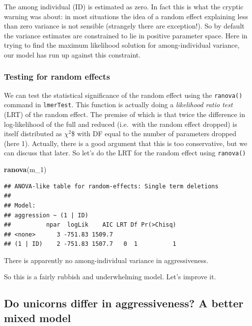 \documentclass[
  12pt,
]{book}
\newenvironment{Shaded}{\begin{snugshade}}{\end{snugshade}}
\newcommand{\DecValTok}[1]{\textcolor[rgb]{0.00,0.00,0.81}{#1}}
\newcommand{\KeywordTok}[1]{\textcolor[rgb]{0.13,0.29,0.53}{\textbf{#1}}}
\newcommand{\NormalTok}[1]{#1}
\begin{document}
The among individual (ID) is estimated as zero. In fact this is what the cryptic warning was about: in most situations the idea of a random effect explaining less than zero variance is not sensible (strangely there are exception!). So by default the variance estimates are constrained to lie in positive parameter space. Here in trying to find the maximum likelihood solution for among-individual variance, our model has run up against this constraint.

\hypertarget{testing-for-random-effects}{%
\subsubsection{Testing for random effects}\label{testing-for-random-effects}}

We can test the statistical significance of the random effect using the \texttt{ranova()} command in \texttt{lmerTest}. This function is actually doing a \emph{likelihood ratio test} (LRT) of the random effect. The premise of which is that twice the difference in log-likelihood of the full and reduced (i.e.~with the random effect dropped) is itself distributed as \(\chi^2\)\$ with DF equal to the number of parameters dropped (here 1). Actually, there is a good argument that this is too conservative, but we can discuss that later. So let's do the LRT for the random effect using \texttt{ranova()}

\begin{Shaded}
\begin{Highlighting}[]
\KeywordTok{ranova}\NormalTok{(m_}\DecValTok{1}\NormalTok{)}
\end{Highlighting}
\end{Shaded}

\begin{verbatim}
## ANOVA-like table for random-effects: Single term deletions
## 
## Model:
## aggression ~ (1 | ID)
##          npar  logLik    AIC LRT Df Pr(>Chisq)
## <none>      3 -751.83 1509.7                  
## (1 | ID)    2 -751.83 1507.7   0  1          1
\end{verbatim}

There is apparently no among-individual variance in aggressiveness.

So this is a fairly rubbish and underwhelming model. Let's improve it.

\hypertarget{do-unicorns-differ-in-aggressiveness-a-better-mixed-model}{%
\subsection{Do unicorns differ in aggressiveness? A better mixed model}\label{do-unicorns-differ-in-aggressiveness-a-better-mixed-model}}
\end{document}
